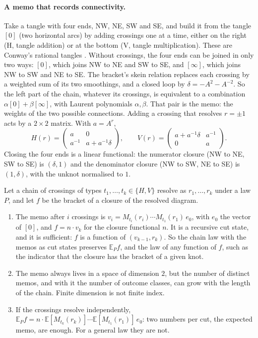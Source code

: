 \documentclass[11pt]{article}
\theoremstyle{definition}\newtheorem{definition}[theorem]{Definition}\newtheorem{remark}[theorem]{Remark}\newtheorem{example}[theorem]{Example}\newtheorem{problem}[theorem]{Open problem}\crefname{problem}{Problem}{Problems}
\begin{document}
\paragraph{A memo that records connectivity.} Take a tangle with four ends, NW, NE, SW and SE, and build it from the tangle $[0]$ (two horizontal arcs) by adding crossings one at a time, either on the right (H, tangle addition) or at the bottom (V, tangle multiplication). These are Conway's rational tangles \cite{Conway1970}. Without crossings, the four ends can be joined in only two ways: $[0]$, which joins NW to NE and SW to SE, and $[\infty]$, which joins NW to SW and NE to SE. The bracket's skein relation replaces each crossing by a weighted sum of its two smoothings, and a closed loop by $\delta=-A^2-A^{-2}$. So the left part of the chain, whatever its crossings, is equivalent to a combination $\alpha[0]+\beta[\infty]$, with Laurent polynomials $\alpha,\beta$. That pair is the memo: the weights of the two possible connections. Adding a crossing that resolves $r=\pm1$ acts by a $2\times2$ matrix. With $a=A^{r}$,
\[
H(r)=\begin{pmatrix}a&0\\a^{-1}&a+a^{-1}\delta\end{pmatrix},\qquad V(r)=\begin{pmatrix}a+a^{-1}\delta&a^{-1}\\0&a\end{pmatrix}.
\]
Closing the four ends is a linear functional: the numerator closure (NW to NE, SW to SE) is $(\delta,1)$ and the denominator closure (NW to SW, NE to SE) is $(1,\delta)$, with the unknot normalised to $1$.

\begin{proposition}\label{prop:tlmemo}
Let a chain of crossings of types $t_1,\dots,t_k\in\{H,V\}$ resolve as $r_1,\dots,r_k$ under a law $P$, and let $f$ be the bracket of a closure of the resolved diagram.
\begin{enumerate}
\item[(1)] The memo after $i$ crossings is $v_i=M_{t_i}(r_i)\cdots M_{t_1}(r_1)\,e_0$, with $e_0$ the vector of $[0]$, and $f=n\cdot v_k$ for the closure functional $n$. It is a recursive cut state, and it is sufficient: $f$ is a function of $(v_{k-1},r_k)$. So the chain law with the memos as cut states preserves $\mathbb E_Pf$, and the law of any function of $f$, such as the indicator that the closure has the bracket of a given knot.
\item[(2)] The memo always lives in a space of dimension $2$, but the number of distinct memos, and with it the number of outcome classes, can grow with the length of the chain. Finite dimension is not finite index.
\item[(3)] If the crossings resolve independently, $\mathbb E_Pf=n\cdot\mathbb E[M_{t_k}(r_k)]\cdots\mathbb E[M_{t_1}(r_1)]\,e_0$: two numbers per cut, the expected memo, are enough. For a general law they are not.
\end{enumerate}
\end{proposition}
\end{document}
